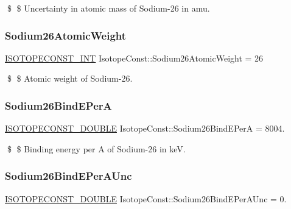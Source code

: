 \$ \$ Uncertainty in atomic mass of Sodium-\/26 in amu. \mbox{\label{group___isotope_const-_sodium-_na26_ga3dcbdb52cf8d44b56112121e5ca0dd09}} 
\subsubsection{\texorpdfstring{Sodium26\+Atomic\+Weight}{Sodium26AtomicWeight}}
{\footnotesize\ttfamily \mbox{\hyperlink{group___isotope_const-_macros_ga5f18360b3e99483a35c32d789e62621c}{I\+S\+O\+T\+O\+P\+E\+C\+O\+N\+S\+T\+\_\+\+I\+NT}} Isotope\+Const\+::\+Sodium26\+Atomic\+Weight = 26}

\$ \$ Atomic weight of Sodium-\/26. \mbox{\label{group___isotope_const-_sodium-_na26_gafe1c79609c2abbdd4771f564fff9135b}} 
\subsubsection{\texorpdfstring{Sodium26\+Bind\+E\+PerA}{Sodium26BindEPerA}}
{\footnotesize\ttfamily \mbox{\hyperlink{group___isotope_const-_macros_ga8f45a7272ce02c0b4c65c44636ed719a}{I\+S\+O\+T\+O\+P\+E\+C\+O\+N\+S\+T\+\_\+\+D\+O\+U\+B\+LE}} Isotope\+Const\+::\+Sodium26\+Bind\+E\+PerA = 8004.}

\$ \$ Binding energy per A of Sodium-\/26 in keV. \mbox{\label{group___isotope_const-_sodium-_na26_gafa79dc6aadc95037f8e07ee573909b98}} 
\subsubsection{\texorpdfstring{Sodium26\+Bind\+E\+Per\+A\+Unc}{Sodium26BindEPerAUnc}}
{\footnotesize\ttfamily \mbox{\hyperlink{group___isotope_const-_macros_ga8f45a7272ce02c0b4c65c44636ed719a}{I\+S\+O\+T\+O\+P\+E\+C\+O\+N\+S\+T\+\_\+\+D\+O\+U\+B\+LE}} Isotope\+Const\+::\+Sodium26\+Bind\+E\+Per\+A\+Unc = 0.}

